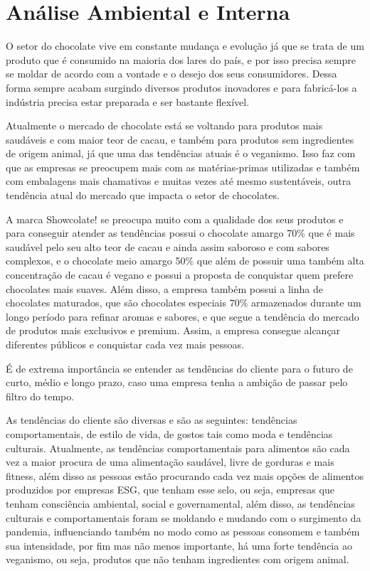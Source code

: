 \documentclass[
	12pt,				%
	openright,			%
	oneside,			%
	a4paper,			%
	english,			%
	french,				%
	spanish,			%
	brazil				%
	]{abntex2}
\begin{document}
\chapter{Análise Ambiental e Interna}

O setor do chocolate vive em constante mudança e evolução já que se trata de um produto que é consumido na maioria dos lares do país, e por isso precisa sempre se moldar de acordo com a vontade e o desejo dos seus consumidores. Dessa forma sempre acabam surgindo diversos produtos inovadores e para fabricá-los a indústria precisa estar preparada e ser bastante flexível.

Atualmente o mercado de chocolate está se voltando para produtos mais saudáveis e com maior teor de cacau, e também para produtos sem ingredientes de origem animal, já que uma das tendências atuais é o veganismo. Isso faz com que as empresas se preocupem mais com as matérias-primas utilizadas e também com embalagens mais chamativas e muitas vezes até mesmo sustentáveis, outra tendência atual do mercado que impacta o setor de chocolates.

A marca Showcolate! se preocupa muito com a qualidade dos seus produtos e para conseguir atender as tendências possui o chocolate amargo 70$\%$ que é mais saudável pelo seu alto teor de cacau e ainda assim saboroso e com sabores complexos, e o chocolate meio amargo 50$\%$ que além de possuir uma também alta concentração de cacau é vegano e possui a proposta de conquistar quem prefere chocolates mais suaves. Além disso, a empresa também possui a linha de chocolates maturados, que são chocolates especiais 70$\%$ armazenados durante um longo período para refinar aromas e sabores, e que segue a tendência do mercado de produtos mais exclusivos e premium. Assim, a empresa consegue alcançar diferentes públicos e conquistar cada vez mais pessoas.

É de extrema importância se entender as tendências do cliente para o futuro de curto, médio e longo prazo, caso uma empresa tenha a ambição de passar pelo filtro do tempo.
	
	As tendências do cliente são diversas e são as seguintes: tendências comportamentais, de estilo de vida, de gostos tais como moda e tendências culturais. Atualmente, as tendências comportamentais para alimentos são cada vez a maior procura de uma alimentação saudável, livre de gorduras e mais fitness, além disso as pessoas estão procurando cada vez mais opções de alimentos produzidos por empresas ESG, que tenham esse selo, ou seja, empresas que tenham consciência ambiental, social e governamental, além disso, as tendências culturais e comportamentais foram se moldando e mudando com o surgimento da pandemia, influenciando também no modo como as pessoas consomem e também sua intensidade, por fim mas não menos importante, há uma forte tendência ao veganismo, ou seja, produtos que não tenham ingredientes com origem animal. 
	
\end{document}
